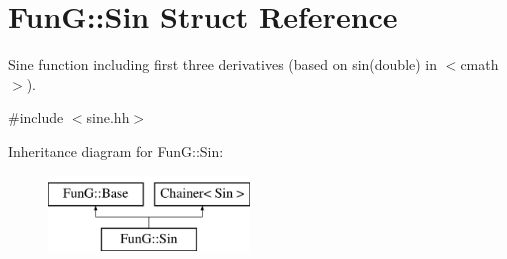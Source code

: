 \hypertarget{structFunG_1_1Sin}{}\section{Fun\+G\+:\+:Sin Struct Reference}
\label{structFunG_1_1Sin}


Sine function including first three derivatives (based on sin(double) in $<$cmath$>$).  




{\ttfamily \#include $<$sine.\+hh$>$}

Inheritance diagram for Fun\+G\+:\+:Sin\+:\begin{figure}[H]
\begin{center}
\leavevmode
\includegraphics[height=2.000000cm]{structFunG_1_1Sin}
\end{center}
\end{figure}
